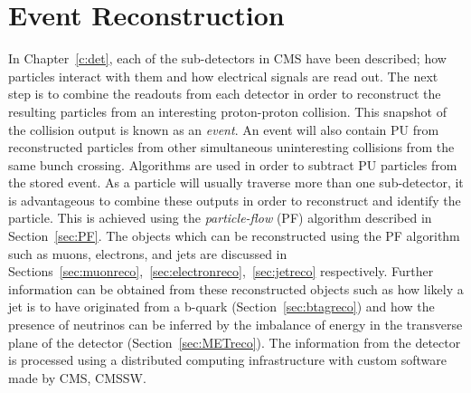 \chapter{Event Reconstruction}
\label{c:recon}


In Chapter~\ref{c:det}, each of the sub-detectors in CMS have been described; how particles interact with them and how electrical signals are read out. The next step is to combine the readouts from each detector in order to reconstruct the resulting particles from an interesting proton-proton collision. This snapshot of the collision output is known as an \emph{event}. An event will also contain PU from reconstructed particles from other simultaneous uninteresting collisions from the same bunch crossing. Algorithms are used in order to subtract PU particles from the stored event. 
As a particle will usually traverse more than one sub-detector, it is advantageous to combine these outputs in order to reconstruct and identify the particle. This is achieved using the \emph{particle-flow} (PF) algorithm described in Section~\ref{sec:PF}. The objects which can be reconstructed using the PF algorithm such as muons, electrons, and jets are discussed in Sections~\ref{sec:muonreco},~\ref{sec:electronreco},~\ref{sec:jetreco} respectively. Further information can be obtained from these reconstructed objects such as how likely a jet is to have originated from a b-quark (Section~\ref{sec:btagreco}) and how the presence of neutrinos can be inferred by the imbalance of energy in the transverse plane of the detector (Section~\ref{sec:METreco}).  
The information from the detector is processed using a distributed computing infrastructure with custom software made by CMS, CMSSW.




